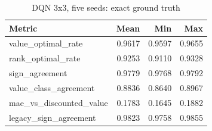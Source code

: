\begin{table}[htbp]
\centering
\caption{DQN 3x3, five seeds: exact ground truth}
\label{tab:dqn_seeds}
\begin{tabular}{lrrr}
\toprule
Metric & Mean & Min & Max \\
\midrule
value\_optimal\_rate & 0.9617 & 0.9597 & 0.9655 \\
rank\_optimal\_rate & 0.9253 & 0.9110 & 0.9328 \\
sign\_agreement & 0.9779 & 0.9768 & 0.9792 \\
value\_class\_agreement & 0.8836 & 0.8640 & 0.8967 \\
mae\_vs\_discounted\_value & 0.1783 & 0.1645 & 0.1882 \\
legacy\_sign\_agreement & 0.9823 & 0.9758 & 0.9855 \\
\bottomrule
\end{tabular}
\end{table}
